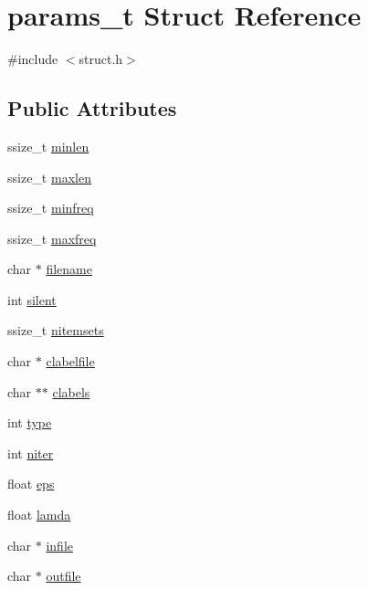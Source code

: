 \hypertarget{structparams__t}{}\section{params\+\_\+t Struct Reference}
\label{structparams__t}


{\ttfamily \#include $<$struct.\+h$>$}

\subsection*{Public Attributes}
\begin{DoxyCompactItemize}
\item 
ssize\+\_\+t \hyperlink{structparams__t_a62fec3324a19ddca57a712e7f149a923}{minlen}
\item 
ssize\+\_\+t \hyperlink{structparams__t_a5f84610a2797c602d516543cbc6463ca}{maxlen}
\item 
ssize\+\_\+t \hyperlink{structparams__t_a8f1649ac427eda7975ea030e6dfb045a}{minfreq}
\item 
ssize\+\_\+t \hyperlink{structparams__t_af444d2c9e2389ae076a5ea654fa17b68}{maxfreq}
\item 
char $\ast$ \hyperlink{structparams__t_a84a8b430e8ade38c694d0350dae3f523}{filename}
\item 
int \hyperlink{structparams__t_a972cd57ea33f4f649a58d5eedb18683e}{silent}
\item 
ssize\+\_\+t \hyperlink{structparams__t_a09cebf1109c096db210409fdce18b5da}{nitemsets}
\item 
char $\ast$ \hyperlink{structparams__t_a7560743e744e17283074b41f149d29d6}{clabelfile}
\item 
char $\ast$$\ast$ \hyperlink{structparams__t_ad22c27f7093c714a9d6ad68da2bfef03}{clabels}
\item 
int \hyperlink{structparams__t_a540f3365a30f0d8b20ba70a920b436b9}{type}
\item 
int \hyperlink{structparams__t_ab849dd261e8436ebfac71288895d1648}{niter}
\item 
float \hyperlink{structparams__t_a554919f5352a2dd6c64e8118203e7a76}{eps}
\item 
float \hyperlink{structparams__t_a1f831fc59e3fc31d12c717af55bd4eee}{lamda}
\item 
char $\ast$ \hyperlink{structparams__t_a1bbb5e505ab32b4d948ab8f4c1b6df34}{infile}
\item 
char $\ast$ \hyperlink{structparams__t_ad3a34457b4d06f940afe93f908a592ad}{outfile}
\item 
$$
\end{DoxyCompactItemize}
